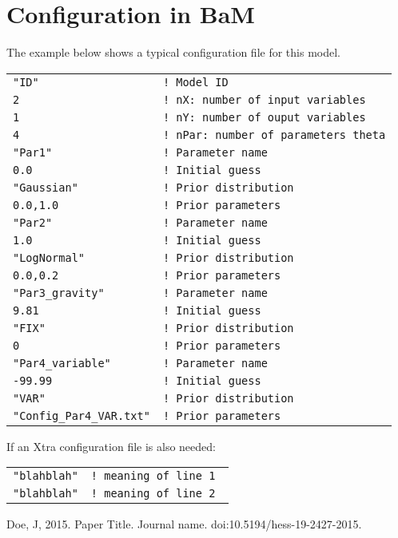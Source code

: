 \documentclass[a4paper]{article}
\begin{document}
\section{Configuration in BaM}
The example below shows a typical configuration file for this model.\\
%
\begin{tcolorbox}
	\begin{tabular}{ll}
		\texttt{"ID"} & \texttt{! Model ID}\\
		\texttt{2} & \texttt{! nX: number of input variables}\\
		\texttt{1} & \texttt{! nY: number of ouput variables}\\
		\texttt{4} & \texttt{! nPar: number of parameters theta}\\
		\texttt{"Par1"} & \texttt{! Parameter name}\\
		\texttt{0.0} & \texttt{! Initial guess}\\
		\texttt{"Gaussian"} & \texttt{! Prior distribution}\\
		\texttt{0.0,1.0} & \texttt{! Prior parameters}\\
		\texttt{"Par2"} & \texttt{! Parameter name}\\
		\texttt{1.0} & \texttt{! Initial guess}\\
		\texttt{"LogNormal"} & \texttt{! Prior distribution}\\
		\texttt{0.0,0.2} & \texttt{! Prior parameters}\\
		\texttt{"Par3\_gravity"} & \texttt{! Parameter name}\\
		\texttt{9.81} & \texttt{! Initial guess}\\
		\texttt{"FIX"} & \texttt{! Prior distribution}\\
		\texttt{0} & \texttt{! Prior parameters}\\
		\texttt{"Par4\_variable"} & \texttt{! Parameter name}\\
		\texttt{-99.99} & \texttt{! Initial guess}\\
		\texttt{"VAR"} & \texttt{! Prior distribution}\\
		\texttt{"Config\_Par4\_VAR.txt"} & \texttt{! Prior parameters}\\
	\end{tabular}
\end{tcolorbox}
%
If an Xtra configuration file is also needed:\\
%
\begin{tcolorbox}
	\begin{tabular}{ll}
		\texttt{"blahblah"} & \texttt{! meaning of line 1 }\\
		\texttt{"blahblah"} & \texttt{! meaning of line 2 }\\
	\end{tabular}
\end{tcolorbox}

\begin{thebibliography}{00}

Doe, J, 2015. Paper Title. Journal name. doi:10.5194/hess-19-2427-2015.

\end{thebibliography}
\end{document}
